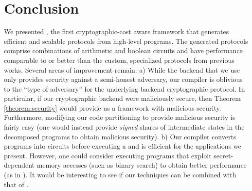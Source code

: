\section{Conclusion}
\label{sec:conclude}
We presented \tool, the first
cryptographic-cost aware framework that generates efficient and
scalable \mpc protocols from high-level programs.
The generated protocols comprise combinations
of arithmetic and boolean circuits and have performance comparable to
or better than the custom, specialized
protocols from previous works. Several areas of improvement remain: a) While the backend that we use~\cite{aby} only provides security against a semi-honest adversary, our compiler is oblivious to the ``type of adversary'' for the underlying backend cryptographic protocol. In particular, if our cryptographic backend were maliciously secure, then Theorem \ref{theorem:security} would provide us a framework with malicious security. Furthermore, modifying our code partitioning to provide malicious security is fairly easy (one would instead provide {\em signed} shares of intermediate states in the decomposed programs to obtain malicious security). b) Our compiler converts programs into circuits before executing a \mpc and is efficient for the applications we present. However, one could consider executing programs that exploit secret-dependent memory accesses (such as binary search) to obtain better performance (as in \cite{oblivm}). It would be interesting to see if our techniques can be combined with that of \cite{oblivm}. 